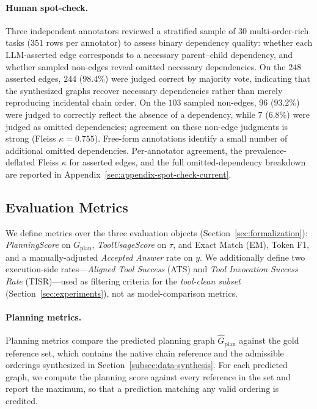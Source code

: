 \documentclass{article}
\begin{document}
\paragraph{Human spot-check.}
Three independent annotators reviewed a stratified sample of \(30\)
multi-order-rich tasks (\(351\) rows per annotator) to assess binary dependency
quality: whether each LLM-asserted edge corresponds to a necessary parent--child
dependency, and whether sampled non-edges reveal omitted necessary dependencies.
On the \(248\) asserted edges, \(244\) (\(98.4\%\)) were judged correct by majority
vote, indicating that the synthesized graphs recover necessary dependencies
rather than merely reproducing incidental chain order. On the \(103\) sampled
non-edges, \(96\) (\(93.2\%\)) were judged to correctly reflect the absence of a
dependency, while \(7\) (\(6.8\%\)) were judged as omitted dependencies;
agreement on these non-edge judgments is strong (Fleiss \(\kappa = 0.755\)).
Free-form annotations identify a small number of additional omitted
dependencies. Per-annotator agreement, the prevalence-deflated Fleiss
\(\kappa\) for asserted edges, and the full omitted-dependency breakdown are
reported in Appendix~\ref{sec:appendix-spot-check-current}.

\subsection{Evaluation Metrics}
\label{sec:benchmark-evaluation}
We define metrics over the three evaluation objects (Section~\ref{sec:formalization}): \emph{PlanningScore} on $G_{\text{plan}}$, \emph{ToolUsageScore} on $\tau$, and Exact Match (EM), Token F1, and a manually-adjusted \emph{Accepted Answer} rate on $y$. We additionally define two execution-side rates---\emph{Aligned Tool Success} (ATS) and \emph{Tool Invocation Success Rate} (TISR)---used as filtering criteria for the \emph{tool-clean subset} (Section~\ref{sec:experiments}), not as model-comparison metrics.

\paragraph{Planning metrics.}
Planning metrics compare the predicted planning graph $\widehat{G}_{\text{plan}}$ against the gold reference set, which contains the native chain reference and the admissible orderings synthesized in Section~\ref{subsec:data-synthesis}. For each predicted graph, we compute the planning score against every reference in the set and report the maximum, so that a prediction matching any valid ordering is credited.
\end{document}
